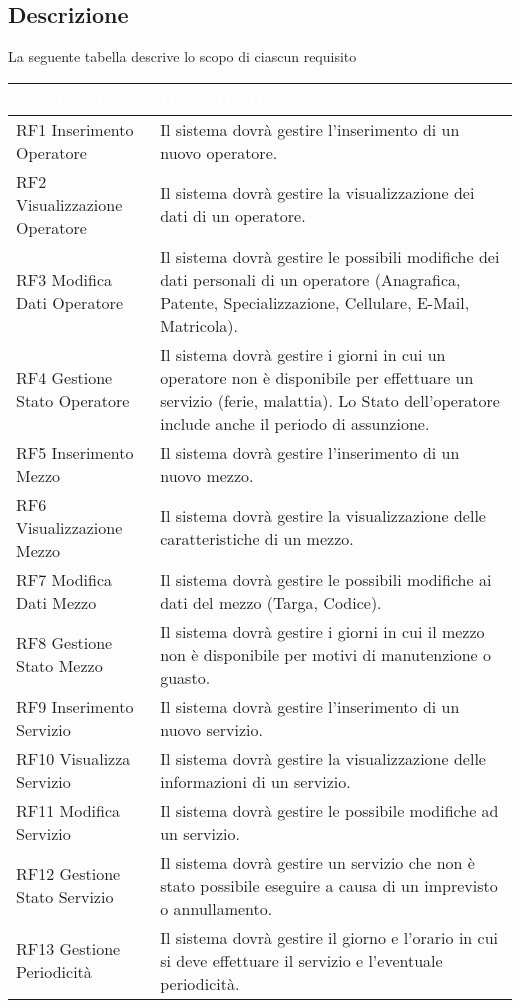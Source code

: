 \documentclass[green, fancy, 11pt]{elegantbook}
\begin{document}
\begin{center}
\section{Descrizione}
La seguente tabella descrive lo scopo di ciascun requisito
{
\small
{}
\begin{tabular}{|p{5cm}|p{10cm}|}
	\hline
	\rowcolor{DarkGreen}
	\textcolor{white}{REQUISITO} & \textcolor{white}{DESCRIZIONE}\\
	\hline
	RF1 Inserimento Operatore & Il sistema dovrà gestire l'inserimento di un nuovo operatore.\\
	\hline
	RF2 Visualizzazione Operatore & Il sistema dovrà gestire la visualizzazione dei dati di un operatore.\\
	\hline
	RF3 Modifica Dati Operatore & Il sistema dovrà gestire le possibili modifiche dei dati personali di un operatore (Anagrafica, Patente, Specializzazione, Cellulare, E-Mail, Matricola).\\
	\hline
	RF4 Gestione Stato Operatore & Il sistema dovrà gestire i giorni in cui un operatore non è disponibile per effettuare un servizio (ferie, malattia). Lo Stato dell'operatore include anche il periodo di assunzione.\\
	\hline
	RF5 Inserimento Mezzo & Il sistema dovrà gestire l'inserimento di un nuovo mezzo.\\
	\hline
	RF6 Visualizzazione Mezzo & Il sistema dovrà gestire la visualizzazione delle caratteristiche di un mezzo.\\
	\hline
	RF7 Modifica Dati Mezzo & Il sistema dovrà gestire le possibili modifiche ai dati del mezzo (Targa, Codice).\\
	\hline
	RF8 Gestione Stato Mezzo & Il sistema dovrà gestire i giorni in cui il mezzo non è disponibile per motivi di manutenzione o guasto.\\
	\hline
	RF9 Inserimento Servizio & Il sistema dovrà gestire l'inserimento di un nuovo servizio.\\
	\hline
	RF10 Visualizza Servizio & Il sistema dovrà gestire la visualizzazione delle informazioni di un servizio.\\
	\hline
	RF11 Modifica Servizio & Il sistema dovrà gestire le possibile modifiche ad un servizio.\\
	\hline
	RF12 Gestione Stato Servizio & Il sistema dovrà gestire un servizio che non è stato possibile eseguire a causa di un imprevisto o annullamento.\\
	\hline
	RF13 Gestione Periodicità & Il sistema dovrà gestire il giorno e l'orario in cui si deve effettuare il servizio e l'eventuale periodicità.\\

\end{tabular}}
\end{center}
\end{document}
